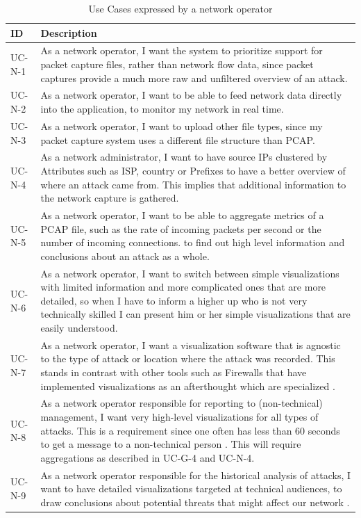 \begin{table}[]
\centering
\begin{tabular}{|p{1.6cm}|p{12cm}|}
\hline
\textbf{ID} & \textbf{Description} \\ \hline

UC-N-1         & As a network operator, I want the system to prioritize support for packet capture files, rather than network flow data, since packet captures provide a much more raw and unfiltered overview of an attack. \\ \hline
UC-N-2        & As a network operator, I want to be able to feed network data directly into the application, to monitor my network in real time.\\ \hline
UC-N-3        & As a network operator, I want to upload other file types, since my packet capture system uses a different file structure than PCAP.\\ \hline
UC-N-4        & As a network administrator, I want to have source IPs clustered by Attributes such as ISP, country or Prefixes to have a better overview of where an attack came from. This implies that additional information to the network capture is gathered.\\ \hline
UC-N-5         & As a network operator, I want to be able to aggregate metrics of a PCAP file, such as the rate of incoming packets per second or the number of incoming connections. to find out high level information and conclusions about an attack as a whole.\\ \hline
UC-N-6        & As a network operator, I want to switch between simple visualizations with limited information and more complicated ones that are more detailed, so when I have to inform a higher up who is not very technically skilled I can present him or her simple visualizations that are easily understood.\\ \hline
UC-N-7       & As a network operator, I want a visualization software that is agnostic to the type of attack or location where the attack was recorded. This stands in contrast with other tools such as Firewalls that have implemented visualizations as an afterthought which are specialized \cite{appliedsecurityvisualization}.\\ \hline
UC-N-8       & As a network operator responsible for reporting to (non-technical) management, I want very high-level visualizations for all types of attacks. This is a requirement since one often has less than 60 seconds to get a message to a non-technical person \cite{appliedsecurityvisualization}. This will require aggregations as described in UC-G-4 and UC-N-4. \\ \hline
UC-N-9       & As a network operator responsible for the historical analysis of attacks, I want to have detailed visualizations targeted at technical audiences, to draw conclusions about potential threats that might affect our network \cite{appliedsecurityvisualization}.\\ \hline

\end{tabular}
\caption{Use Cases expressed by a network operator}
\label{table:us-operator}
\end{table} 

